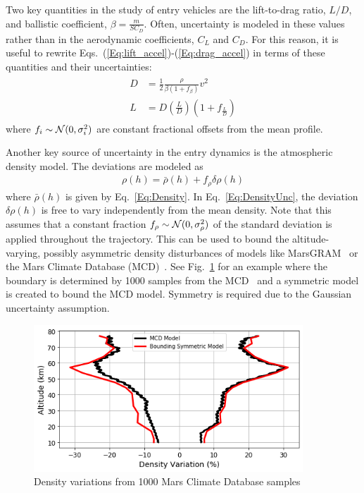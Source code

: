 Two key quantities in the study of entry vehicles are the lift-to-drag ratio, $L/D$, and ballistic coefficient, $\beta = \frac{m}{SC_D}$. Often, uncertainty is modeled in these values rather than in the aerodynamic coefficients, $C_L$ and $C_D$. For this reason, it is useful to rewrite Eqs.~(\ref{Eq:lift_accel})-(\ref{Eq:drag_accel}) in terms of these quantities and their uncertainties:
\begin{align}
	\begin{split}
		D &= \frac{1}{2}\frac{\rho}{\beta(1 + f_{\beta})} v^2 \\
		L &= D(\frac{L}{D})(1+f_{\frac{L}{D}})  \label{Eq:aero_accels}
	\end{split}
\end{align}
where $f_i\sim\mathcal{N}(0, \sigma^2_i)$ are constant fractional offsets from the mean profile.

Another key source of uncertainty in the entry dynamics is the atmospheric density model. The deviations are modeled as 
\begin{align}
	\rho(h) = \bar{\rho}(h) + f_{\rho}\delta\rho(h) \label{Eq:DensityUnc}
\end{align}
where $\bar{\rho}(h)$ is given by Eq.~\eqref{Eq:Density}. In Eq.~\eqref{Eq:DensityUnc}, the deviation $\delta\rho(h)$ is free to vary independently from the mean density. Note that this assumes that a constant fraction $f_{\rho}\sim\mathcal{N}(0, \sigma^2_{\rho})$ of the standard deviation is applied throughout the trajectory. This can be used to bound the altitude-varying, possibly asymmetric density disturbances of models like MarsGRAM~\cite{MarsGRAM2010} or the Mars Climate Database (MCD)~\cite{MarsClimateDB}. See Fig.~\ref{Fig:DensityVariations} for an example where the boundary is determined by 1000 samples from the MCD~\cite{GuangfeiDissertation} and a symmetric model is created to bound the MCD model. Symmetry is required due to the Gaussian uncertainty assumption. 
\begin{figure}[h!]
	\centering
	\includegraphics[width=0.9\textwidth]{Images/DensityVariations}
	\caption{Density variations from 1000 Mars Climate Database samples}
	\label{Fig:DensityVariations}
\end{figure} 


